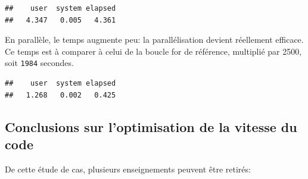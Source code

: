 \documentclass[
  12pt,
  french,
  a4paper,
  extrafontsizes,onecolumn,openright
  ]{memoir}
\newenvironment{Shaded}{\begin{snugshade}}{\end{snugshade}}
\newcommand{\DecValTok}[1]{\textcolor[rgb]{0.00,0.00,0.81}{#1}}
\newcommand{\FunctionTok}[1]{\textcolor[rgb]{0.13,0.29,0.53}{\textbf{#1}}}
\newcommand{\NormalTok}[1]{#1}
\newcommand{\OtherTok}[1]{\textcolor[rgb]{0.56,0.35,0.01}{#1}}
\newcommand{\SpecialCharTok}[1]{\textcolor[rgb]{0.81,0.36,0.00}{\textbf{#1}}}
\begin{document}
\scriptsize

\begin{Shaded}
\end{Shaded}

\begin{verbatim}
##    user  system elapsed 
##   4.347   0.005   4.361
\end{verbatim}

\normalsize

En parallèle, le temps augmente peu: la parallélisation devient réellement efficace.
Ce temps est à comparer à celui de la boucle for de référence, multiplié par 2500, soit \texttt{1984} secondes.

\scriptsize

\begin{Shaded}
\end{Shaded}

\begin{verbatim}
##    user  system elapsed 
##   1.268   0.002   0.425
\end{verbatim}

\normalsize

\subsection{Conclusions sur l'optimisation de la vitesse du code}\label{conclusions-sur-loptimisation-de-la-vitesse-du-code}

De cette étude de cas, plusieurs enseignements peuvent être retirés:
\end{document}
